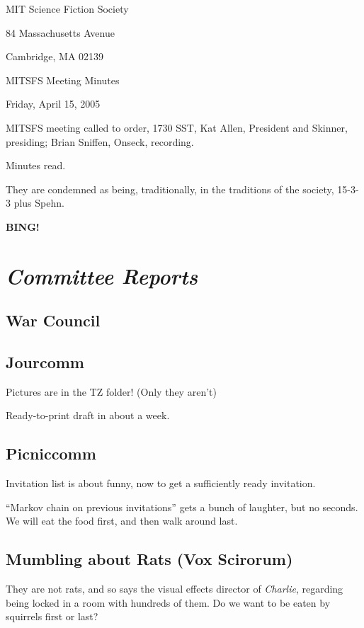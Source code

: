 \documentclass[10pt]{article}
\newcommand{\bing}{{\bf BING!} }
\newcommand{\goto}[1]{\bing \vskip 12pt \section*{{\em{#1}}}}
\newcommand{\ps}{ plus Spehn\xspace}
\begin{document}
\begin{center}

MIT Science Fiction Society

84 Massachusetts Avenue

Cambridge, MA 02139

\vspace{12pt}

MITSFS Meeting Minutes

Friday, April 15, 2005

\end{center}

\vspace{18pt}

\setlength{\parskip}{6pt}

\noindent
MITSFS meeting called to order, 1730 SST, Kat Allen, President and
Skinner, presiding; Brian Sniffen,  Onseck, recording.

Minutes read.

They are condemned as being, traditionally, in the traditions of the
society, 15-3-3\ps.

\goto{Committee Reports}
\subsection*{War Council}

\subsection*{Jourcomm}
Pictures are in the TZ folder!  (Only they aren't)

Ready-to-print draft in about a week.

\subsection*{Picniccomm}
Invitation list is about funny, now to get a sufficiently ready invitation.

``Markov chain on previous invitations'' gets a bunch of laughter, but
no seconds.  We will eat the food first, and then walk around last.

\subsection*{Mumbling about Rats (Vox Scirorum)}
They are not rats, and so says the visual effects director of
\emph{Charlie}, regarding being locked in a room with hundreds of them.
Do we want to be eaten by squirrels first or last?
\end{document}
